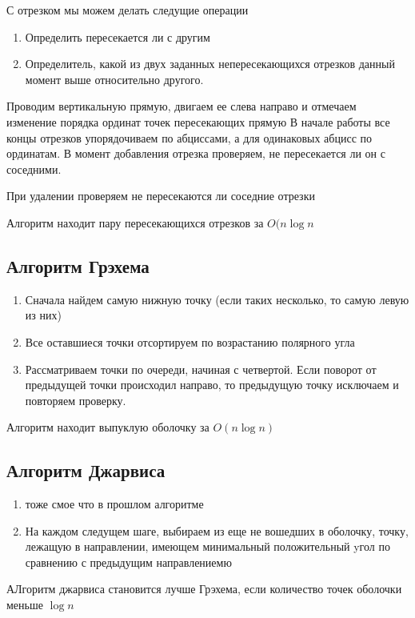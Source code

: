 \documentclass{scrartcl}
\begin{document}
С отрезком мы можем делать следущие операции
\begin{enumerate}
    \item Определить пересекается ли с другим
    \item
        Определитель, какой из двух заданных непересекающихся отрезков данный момент выше относительно другого.
\end{enumerate}
Проводим вертикальную прямую, двигаем ее слева направо и отмечаем изменение порядка ординат точек пересекающих прямую
В начале работы все концы отрезков упорядочиваем по абциссами,  а 
для одинаковых абцисс по ординатам.
В момент добавления отрезка проверяем, не пересекается ли он с соседними.

При удалении проверяем не пересекаются ли соседние отрезки

Алгоритм находит пару пересекающихся отрезков за $O(n \log{n}$
\subsection{Алгоритм Грэхема}
\begin{enumerate}
	\item Сначала найдем самую нижную точку (если таких несколько, то самую левую из них)
	\item Все оставшиеся точки отсортируем по возрастанию полярного угла
	\item Рассматриваем точки по очереди, начиная с четвертой. Если поворот от предыдущей точки происходил направо, то предыдущую точку исключаем и повторяем проверку.
\end{enumerate}
Алгоритм находит выпуклую оболочку за $O(n \log{n})$
\subsection{Алгоритм Джарвиса}
\begin{enumerate}
    \item тоже смое что в прошлом алгоритме
    \item На каждом следущем шаге, выбираем из
        еще не вошедших в оболочку, точку, лежащую в направлении, имеющем минимальный положительный yгол по сравнению с предыдущим направлениемю
\end{enumerate}
АЛгоритм джарвиса становится лучше Грэхема, если количество точек оболочки меньше $\log{n}$
\end{document}
